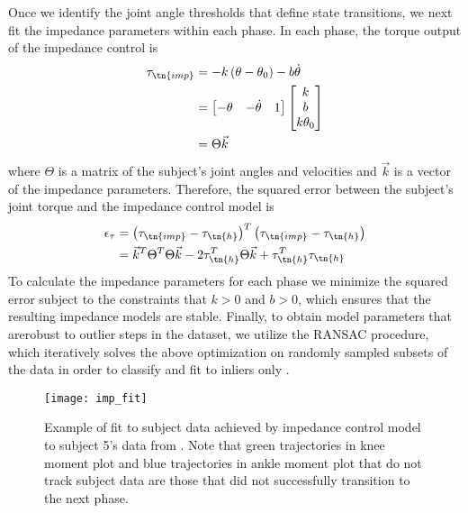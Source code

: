 Once we identify the joint angle thresholds that define state transitions, we
next fit the impedance parameters within each phase. In each phase, the torque
output of the impedance control is 
\begin{align}
    \tau_\tn{imp} &= -k \left( \theta - \theta_0 \right) - b \dot{\theta} \\
        &= \begin{bmatrix} -\theta & -\dot{\theta} & 1 \end{bmatrix}
            \begin{bmatrix} k \\ b \\ k \theta_0 \end{bmatrix} \\
        &= \Theta \vec{k}
\end{align}
where $\Theta$ is a matrix of the subject's joint angles and velocities and
$\vec{k}$ is a vector of the impedance parameters. Therefore, the squared error
between the subject's joint torque and the impedance control model is
\begin{align}
    \epsilon_\tau & = {\left( \tau_\tn{imp} - \tau_\tn{h} \right)}^T 
        \left( \tau_\tn{imp} - \tau_\tn{h} \right) \\
        &= \vec{k}^T \Theta^T \Theta \vec{k} - 2\tau_\tn{h}^T \Theta \vec{k} 
        + \tau_\tn{h}^T \tau_\tn{h}
\end{align}
To calculate the impedance parameters for each phase we minimize the squared
error subject to the constraints that $k>0$ and ${b > 0}$, which ensures that
the resulting impedance models are stable. Finally, to obtain model parameters
that arerobust to outlier steps in the dataset, we utilize the RANSAC procedure,
which iteratively solves the above optimization on randomly sampled subsets of
the data in order to classify and fit to inliers only
\citep{fischler1981random}.

\begin{figure}[t]
    \centering 
    \texttt{[image: imp\_fit]}
    \caption[Example of fit to subject data achieved by impedance control model
    to subject 5's data from \citet{moore2015elaborate}]{Example of fit to
    subject data achieved by impedance control model to subject 5's data from
    \citet{moore2015elaborate}. Note that green trajectories in knee moment plot
    and blue trajectories in ankle moment plot that do not track subject data
    are those that did not successfully transition to the next
    phase.}\label{fig:treadmill_imp_fit}
\end{figure}

